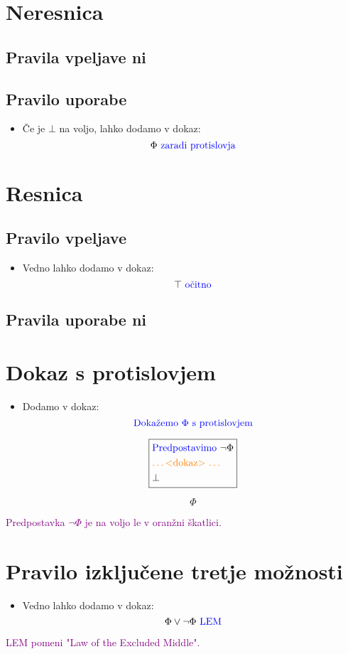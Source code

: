 \documentclass[12pt,a4paper]{article}
\newcommand{\blue}[1]{\textcolor{blue}{#1}}
\newcommand{\orange}[1]{\textcolor{orange}{#1}}
\newcommand{\purple}[1]{\textcolor{purple}{#1}}
\newcommand{\dokaz}{\orange{\text{\ldots <dokaz> \ldots}}}
\newcommand{\skatlica}[1]{
    \begin{equation*}
        \boxed{
        \begin{aligned}
            #1
        \end{aligned}
        }
    \end{equation*}
}
\begin{document}
\section{Neresnica}
    \subsection*{Pravila vpeljave ni}
    \subsection*{Pravilo uporabe}
    \begin{itemize}
        \item Če je $ \bot $ na voljo, lahko dodamo v dokaz:
        $$ \Phi \blue{\text{ zaradi protislovja}}  $$
    \end{itemize}

\section{Resnica}
    \subsection*{Pravilo vpeljave}
    \begin{itemize}
        \item Vedno lahko dodamo v dokaz:
        $$ \top \blue{\text{ očitno}}  $$
    \end{itemize}
    \subsection*{Pravila uporabe ni}

\section{Dokaz s protislovjem}
    \begin{itemize}
            \item Dodamo v dokaz:
            $$ \blue{\text{Dokažemo } \Phi \text{ s protislovjem}} $$
            \skatlica{
                &\blue{\text{Predpostavimo }} \neg \Phi \\ 
                &\dokaz \\ 
                &\bot 
            }
            $$ \Phi $$
    \end{itemize}
    \purple{Predpostavka $ \neg \Phi $ je na voljo le v oranžni škatlici.}

\section{Pravilo izključene tretje možnosti}
    \begin{itemize}
        \item Vedno lahko dodamo v dokaz:
        $$ \Phi \vee \neg \Phi \blue{\text{ LEM}}  $$
    \end{itemize}
    \purple{LEM pomeni "Law of the Excluded Middle".}
\end{document}
